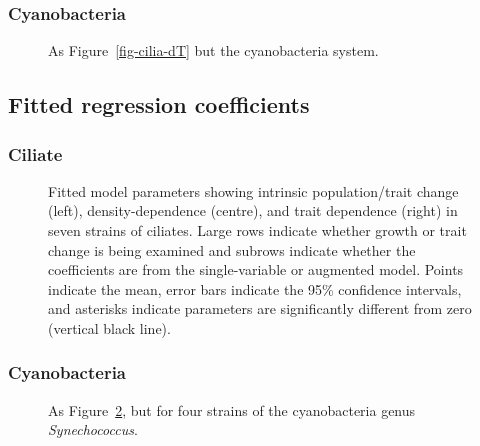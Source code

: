 \documentclass[
  letterpaper,
  DIV=11,
  numbers=noendperiod]{scrartcl}
\begin{document}
\subsubsection{Cyanobacteria}\label{cyanobacteria-2}

\begin{figure}


\caption{\label{fig-cyano-dT}As Figure~\ref{fig-cilia-dT} but the
cyanobacteria system.}

\end{figure}%

\subsection{Fitted regression
coefficients}\label{fitted-regression-coefficients}

\subsubsection{Ciliate}\label{ciliate-3}

\begin{figure}


\caption{\label{fig-cilia-td-general}Fitted model parameters showing
intrinsic population/trait change (left), density-dependence (centre),
and trait dependence (right) in seven strains of ciliates. Large rows
indicate whether growth or trait change is being examined and subrows
indicate whether the coefficients are from the single-variable or
augmented model. Points indicate the mean, error bars indicate the 95\%
confidence intervals, and asterisks indicate parameters are
significantly different from zero (vertical black line).}

\end{figure}%

\subsubsection{Cyanobacteria}\label{cyanobacteria-3}

\begin{figure}


\caption{\label{fig-cyano-td-general}As
Figure~\ref{fig-cilia-td-general}, but for four strains of the
cyanobacteria genus \emph{Synechococcus}.}

\end{figure}%
\end{document}
